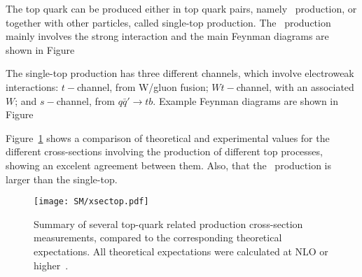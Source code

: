 The top quark can be produced either in top quark pairs, namely \ttbar\ production, or together with other particles, called single-top production. The \ttbar\ production mainly involves the strong interaction and the main Feynman diagrams are shown in Figure%


The single-top production has three different channels, which involve electroweak interactions: $t-$channel, from W/gluon fusion; $Wt-$channel, with an associated $W$; and $s-$channel, from $q\bar{q}'\to tb$. Example Feynman diagrams are shown in Figure%


Figure~\ref{figSM:topcrossection} shows a comparison of theoretical and experimental values for the different cross-sections involving the production of different top processes, showing an excelent agreement between them. Also, that the \ttbar\ production is larger than the single-top.

\begin{figure}[htbp]
    \RawFloats
    \begin{center}
    \texttt{[image: SM/xsectop.pdf]}
    \caption{
        Summary of several top-quark related production cross-section measurements, compared to the corresponding theoretical expectations. All theoretical expectations were calculated at NLO or higher~\cite{ATL-PHYS-PUB-2022-031}.
    }
    \label{figSM:topcrossection}
    \end{center}
\end{figure}

